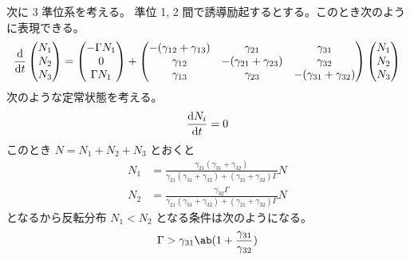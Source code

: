 \documentclass[uplatex,dvipdfmx,a4paper,11pt]{jlreq}
\numberwithin{equation}{section}
\theoremstyle{definition}
\begin{document}
次に 3 準位系を考える。
準位 1, 2 間で誘導励起するとする。このとき次のように表現できる。
\begin{align}
  \diff{}{t}
  \begin{pmatrix}
    N_1 \\
    N_2 \\
    N_3
  \end{pmatrix}
  =
  \begin{pmatrix}
    -\Gamma N_1 \\
    0           \\
    \Gamma N_1
  \end{pmatrix}
  +
  \begin{pmatrix}
    -(\gamma_{12} + \gamma_{13}) & \gamma_{21}                  & \gamma_{31}                   \\
    \gamma_{12}                  & -(\gamma_{21} + \gamma_{23}) & \gamma_{32}                   \\
    \gamma_{13}                  & \gamma_{23}                  & - (\gamma_{31} + \gamma_{32})
  \end{pmatrix}
  \begin{pmatrix}
    N_1 \\
    N_2 \\
    N_3
  \end{pmatrix}
\end{align}
次のような定常状態を考える。
\begin{align}
  \diff{N_i}{t} = 0
\end{align}
このとき $N = N_1 + N_2 + N_3$ とおくと
\begin{align}
  N_1 & = \frac{\gamma_{21}(\gamma_{31} + \gamma_{32})}{\gamma_{21}(\gamma_{31} + \gamma_{32}) + (\gamma_{21} + \gamma_{32})\Gamma}N \\
  N_2 & = \frac{\gamma_{32}\Gamma}{\gamma_{21}(\gamma_{31} + \gamma_{32}) + (\gamma_{21} + \gamma_{32})\Gamma}N
\end{align}
となるから反転分布 $N_1 < N_2$ となる条件は次のようになる。
\begin{align}
  \Gamma > \gamma_{31}\ab(1 + \frac{\gamma_{31}}{\gamma_{32}})
\end{align}
\end{document}
